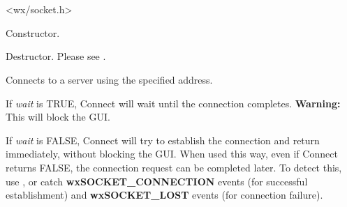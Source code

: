 
\section{}\label{wxsocketclient}




<wx/socket.h>


%
%


Constructor.



%
%


Destructor. Please see .

%
%
\label{wxsocketclientconnect}


Connects to a server using the specified address.

If {\it wait} is TRUE, Connect will wait until the connection
completes. {\bf Warning:} This will block the GUI.

If {\it wait} is FALSE, Connect will try to establish the connection and
return immediately, without blocking the GUI. When used this way, even if
Connect returns FALSE, the connection request can be completed later.
To detect this, use ,
or catch {\bf wxSOCKET\_CONNECTION} events (for successful establishment)
and {\bf wxSOCKET\_LOST} events (for connection failure).

